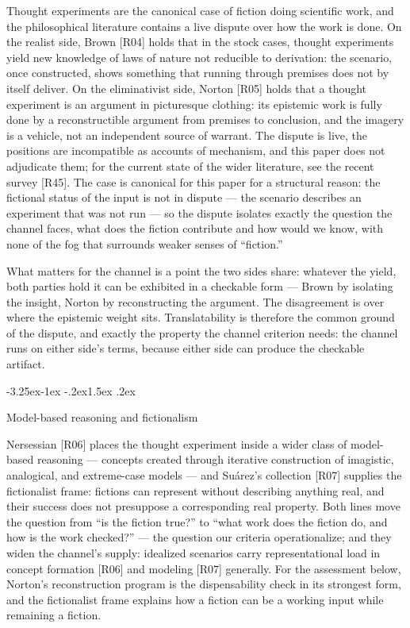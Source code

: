\documentclass[11pt,a4paper]{article}
\makeatletter
\renewcommand\subsection{\@startsection{subsection}{2}{\z@}%
  {-3.25ex\@plus -1ex \@minus -.2ex}{1.5ex \@plus .2ex}%
  {\normalfont\large\bfseries\raggedright}}
\makeatother
\begin{document}
Thought experiments are the canonical case of fiction doing scientific work, and the philosophical literature contains a live dispute over how the work is done. On the realist side, Brown [R04] holds that in the stock cases, thought experiments yield new knowledge of laws of nature not reducible to derivation: the scenario, once constructed, shows something that running through premises does not by itself deliver. On the eliminativist side, Norton [R05] holds that a thought experiment is an argument in picturesque clothing: its epistemic work is fully done by a reconstructible argument from premises to conclusion, and the imagery is a vehicle, not an independent source of warrant. The dispute is live, the positions are incompatible as accounts of mechanism, and this paper does not adjudicate them; for the current state of the wider literature, see the recent survey [R45]. The case is canonical for this paper for a structural reason: the fictional status of the input is not in dispute — the scenario describes an experiment that was not run — so the dispute isolates exactly the question the channel faces, what does the fiction contribute and how would we know, with none of the fog that surrounds weaker senses of ``fiction.''

What matters for the channel is a point the two sides share: whatever the yield, both parties hold it can be exhibited in a checkable form — Brown by isolating the insight, Norton by reconstructing the argument. The disagreement is over where the epistemic weight sits. Translatability is therefore the common ground of the dispute, and exactly the property the channel criterion needs: the channel runs on either side's terms, because either side can produce the checkable artifact.

\subsection{Model-based reasoning and fictionalism}

Nersessian [R06] places the thought experiment inside a wider class of model-based reasoning — concepts created through iterative construction of imagistic, analogical, and extreme-case models — and Suárez's collection [R07] supplies the fictionalist frame: fictions can represent without describing anything real, and their success does not presuppose a corresponding real property. Both lines move the question from ``is the fiction true?'' to ``what work does the fiction do, and how is the work checked?'' — the question our criteria operationalize; and they widen the channel's supply: idealized scenarios carry representational load in concept formation [R06] and modeling [R07] generally. For the assessment below, Norton's reconstruction program is the dispensability check in its strongest form, and the fictionalist frame explains how a fiction can be a working input while remaining a fiction.
\end{document}
